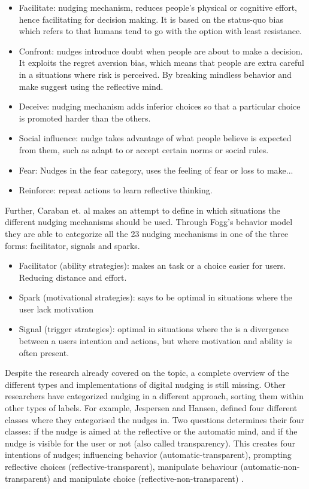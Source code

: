 \begin{itemize}
\item Facilitate: nudging mechanism, reduces people's physical or cognitive effort, hence facilitating for decision making. It is based on the status-quo bias which refers to that humans tend to go with the option with least resistance.
\item Confront: nudges introduce doubt when people are about to make a decision. It exploits the regret aversion bias, which means that people are extra careful in a situations where risk is perceived. By breaking mindless behavior and make suggest using the reflective mind. 
\item Deceive: nudging mechanism adds inferior choices so that a particular choice is promoted harder than the others. 
\item Social influence:  nudge takes advantage of what people believe is expected from them, such as adapt to or accept certain norms or social rules. 
\item Fear: Nudges in the fear category, uses the feeling of fear or loss to make... 
\item Reinforce: repeat actions to learn reflective thinking. 
\end{itemize}

Further, Caraban et. al \cite{caraban_23_2019} makes an attempt to define in which situations the different nudging mechanisms should be used. Through Fogg's behavior model they are able to categorize all the 23 nudging mechanisms in one of the three forms: facilitator, signals and sparks.

\begin{itemize}
\item Facilitator (ability strategies): makes an task or a choice easier for users. Reducing distance and effort. 
\item Spark (motivational strategies): says to be optimal in situations where the user lack motivation 
\item Signal (trigger strategies): optimal in situations where the is a divergence between a users intention and actions, but where motivation and ability is often present. 
\end{itemize}

Despite the research already covered on the topic, a complete overview of the different types and implementations of digital nudging is still missing. Other researchers have categorized nudging in a different approach, sorting them within other types of labels. For example, Jespersen and Hansen\cite{hansen_nudge_2013}, defined four different classes where they categorised the nudges in. %
Two questions determines their four classes: if the nudge is aimed at the reflective or the automatic mind, and if the nudge is visible for the user or not (also called transparency). This creates four intentions of nudges; influencing behavior (automatic-transparent), prompting reflective choices (reflective-transparent), manipulate behaviour (automatic-non-transparent) and manipulate choice (reflective-non-transparent) \cite{hansen_nudge_2013}.

